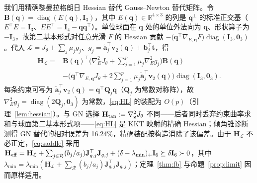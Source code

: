 我们用精确黎曼拉格朗日 Hessian 替代 Gauss--Newton 替代矩阵。令 $\mathbf B(\mathbf q)=\operatorname{diag}(E(\mathbf q),\mathbf I_3)$，其中 $E(\mathbf q)\in\mathbb{R}^{4\times3}$ 的列是 $\mathbf q^\perp$ 的标准正交基（$E^\top E=\mathbf I_3$、$EE^\top=\mathbf I_4-\mathbf q\mathbf q^\top$）。单位球面在 $\mathbf q$ 处的单位外法向为 $\mathbf q$、形状算子为 $-\mathbf I_3$，故第二基本形式对任意光滑 $F$ 的 Hessian 贡献 $-\big(\mathbf q^\top\nabla_{E,\mathbf q}F\big)\operatorname{diag}(\mathbf I_3,\mathbf 0_3)$。代入 $\mathcal L=J_\theta+\sum_j\mu_jg_j$、$g_j=\tilde{\mathbf a}_j^\top\mathbf v_2(\mathbf q)+\mathbf b_j^\top\mathbf t$，得
\begin{equation}
\begin{aligned}
\mathbf H_{\mathcal L}={}&\mathbf B(\mathbf q)^\top\Big(\nabla_E^2J_\theta+\sum_{j=1}^p\mu_j\nabla_E^2g_j\Big)\mathbf B(\mathbf q)\\
&-\Big(\mathbf q^\top\nabla_{E,\mathbf q}J_\theta+2\sum_{j=1}^p\mu_j\tilde{\mathbf a}_j^\top\mathbf v_2(\mathbf q)\Big)\operatorname{diag}(\mathbf I_3,\mathbf 0_3).
\end{aligned}
\label{eq:HL}
\end{equation}
每条约束可写为 $\tilde{\mathbf a}_j^\top\mathbf v_2(\mathbf q)=\mathbf q^\top\mathbf Q_j\mathbf q$（$\mathbf Q_j$ 为常数对称阵），故 $\nabla_E^2g_j=\operatorname{diag}(2\mathbf Q_j,\mathbf 0_3)$ 为常数，\eqref{eq:HL} 的装配为 $O(p)$（引理~\ref{lem:hessian}）。与 GN 选择 $\mathbf H_{\rm tan}:=\nabla^2_{\mathbf z}J_\theta$ 不同——后者同时丢弃约束曲率求和与球面第二基本形式项——\eqref{eq:HL} 是 KKT 映射的精确 Hessian；倾角锥诊断测得 GN 替代的相对误差为 16.24\%，精确装配按构造消除了该偏差。由于 $\mathbf H_{\mathcal L}$ 不必正定，\eqref{eq:saddle} 采用 $\mathbf H_{\rm eff}=\mathbf H_{\mathcal L}+\sum_{j\in\mathcal R}(b_j/a_j)\mathbf J_{g,j}^\top\mathbf J_{g,j}+(\delta-\lambda_{\min})_+\mathbf I_6\succeq\delta\mathbf I_6\succ0$，其中 $\lambda_{\min}=\lambda_{\min}(\mathbf H_{\mathcal L}+\sum_{\mathcal R}(b_j/a_j)\mathbf J_{g,j}^\top\mathbf J_{g,j})$；定理~\ref{thm:fb} 与命题~\ref{prop:limit} 因而原样适用。

